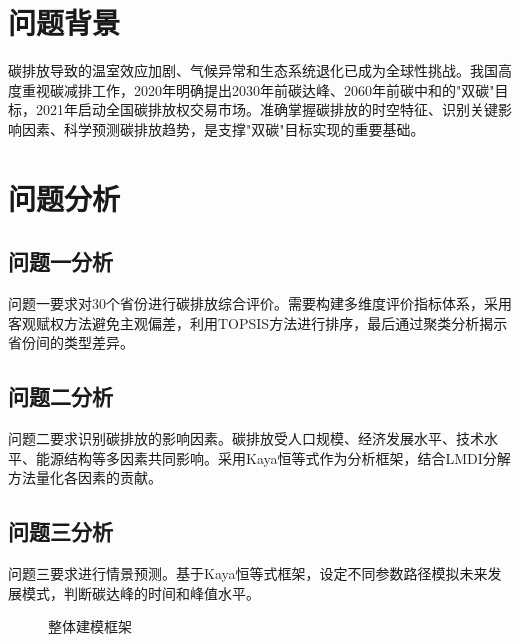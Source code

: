 \documentclass[12pt, a4paper]{article}
\begin{document}
\section{问题背景}

碳排放导致的温室效应加剧、气候异常和生态系统退化已成为全球性挑战。我国高度重视碳减排工作，2020年明确提出2030年前碳达峰、2060年前碳中和的"双碳"目标，2021年启动全国碳排放权交易市场。准确掌握碳排放的时空特征、识别关键影响因素、科学预测碳排放趋势，是支撑"双碳"目标实现的重要基础。

\section{问题分析}

\subsection{问题一分析}
问题一要求对30个省份进行碳排放综合评价。需要构建多维度评价指标体系，采用客观赋权方法避免主观偏差，利用TOPSIS方法进行排序，最后通过聚类分析揭示省份间的类型差异。

\subsection{问题二分析}
问题二要求识别碳排放的影响因素。碳排放受人口规模、经济发展水平、技术水平、能源结构等多因素共同影响。采用Kaya恒等式作为分析框架，结合LMDI分解方法量化各因素的贡献。

\subsection{问题三分析}
问题三要求进行情景预测。基于Kaya恒等式框架，设定不同参数路径模拟未来发展模式，判断碳达峰的时间和峰值水平。

\begin{figure}[H]
\centering
{}
\caption{整体建模框架}
\label{fig:framework}
\end{figure}
\end{document}
